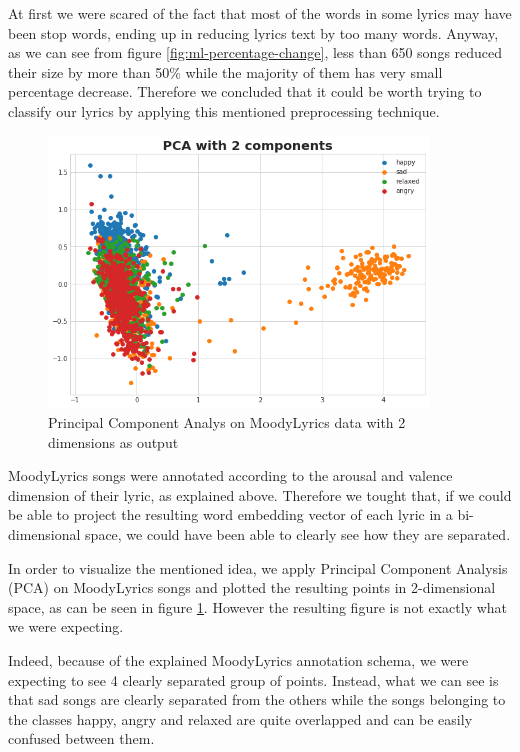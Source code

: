 At first we were scared of the fact that most of the words in some lyrics may have been
stop words, ending up in reducing lyrics text by too many words. Anyway, as we can see 
from figure \ref{fig:ml-percentage-change}, less than 650 songs reduced their size by 
more than 50\% while the majority of them has very small percentage decrease. Therefore
we concluded that it could be worth trying to classify our lyrics by applying this mentioned
preprocessing technique.

\begin{figure}
  \centering
  \includegraphics[width=0.9\textwidth]{./chapters/chapter4/images/ml-pca.png}
  \caption{Principal Component Analys on MoodyLyrics data with 2 dimensions as output}
  \label{fig:ml-pca}
\end{figure}

MoodyLyrics songs were annotated according to the arousal and valence dimension of their lyric,
as explained above. Therefore we tought that, if we could be able to project the resulting
word embedding vector of each lyric in a bi-dimensional space, we could have been able to 
clearly see how they are separated.

In order to visualize the mentioned idea, we apply Principal Component Analysis (PCA) on
MoodyLyrics songs and plotted the resulting points in 2-dimensional space, as can be seen in 
figure \ref{fig:ml-pca}. However the resulting figure is not exactly what we were expecting.

Indeed, because of the explained MoodyLyrics annotation schema, we were expecting to see 4
clearly separated group of points. Instead, what we can see is that sad songs are clearly 
separated from the others while the songs belonging to the classes happy, angry and relaxed
are quite overlapped and can be easily confused between them.

